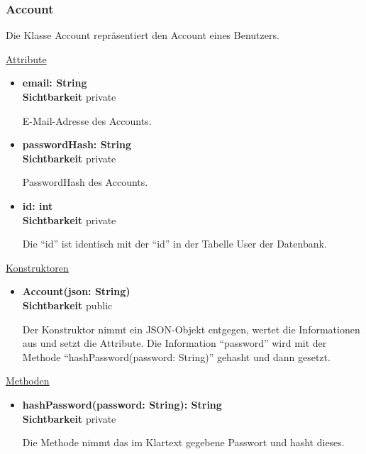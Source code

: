 \subsubsection{Account} \label{service:klasse:Account}
Die Klasse Account repräsentiert den Account eines Benutzers. \newline

\underline{Attribute}
\begin{itemize}
\itemsep0pt
\item \textbf{email: String} \hfill\\ 
\textbf{Sichtbarkeit} private 

E-Mail-Adresse des Accounts.

\item \textbf{passwordHash: String} \hfill\\ 
\textbf{Sichtbarkeit} private 

PasswordHash des Accounts.

\item \textbf{id: int} \hfill\\ 
\textbf{Sichtbarkeit} private  

Die ``id'' ist identisch mit der ``id'' in der Tabelle User der Datenbank.
\end{itemize}

\underline{Konstruktoren}
\begin{itemize}
\itemsep0pt
\item \textbf{Account(json: String)} \hfill\\
\textbf{Sichtbarkeit} public

Der Konstruktor nimmt ein JSON-Objekt entgegen, wertet die Informationen aus und setzt die Attribute. Die Information ``password'' wird mit der Methode ``hashPassword(password: String)'' gehasht und dann gesetzt.
\end{itemize}

\underline{Methoden}
\begin{itemize}
\itemsep0pt
\item \textbf{hashPassword(password: String): String}\hfill\\
\textbf{Sichtbarkeit} private

Die Methode nimmt das im Klartext gegebene Passwort und hasht dieses.
\end{itemize}